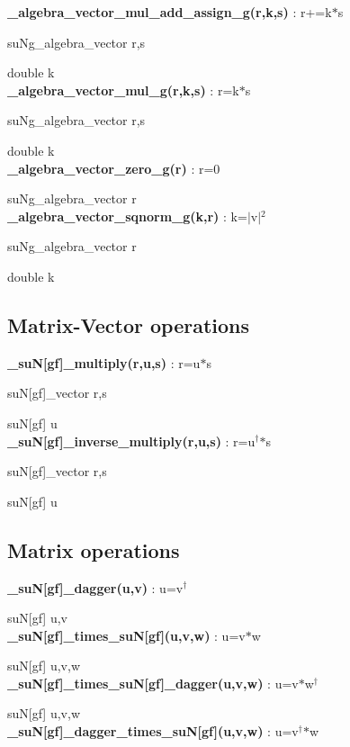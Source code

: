 \documentclass[10pt]{article}
\begin{document}
\noindent\textbf{\_algebra\_vector\_mul\_add\_assign\_g(r,k,s) } : r+=k$*$s

suNg\_algebra\_vector r,s

double k\\


\noindent\textbf{\_algebra\_vector\_mul\_g(r,k,s) } : r=k$*$s

suNg\_algebra\_vector r,s

double k\\


\noindent\textbf{\_algebra\_vector\_zero\_g(r) } : r=0

suNg\_algebra\_vector r\\


\noindent\textbf{\_algebra\_vector\_sqnorm\_g(k,r) } : k=$|$v$|$$^2$

suNg\_algebra\_vector r

double k

\subsection{Matrix-Vector operations}

\noindent\textbf{\_suN[gf]\_multiply(r,u,s) } : r=u$*$s

suN[gf]\_vector r,s

suN[gf] u\\


\noindent\textbf{\_suN[gf]\_inverse\_multiply(r,u,s) } : r=u$^\dagger$$*$s

suN[gf]\_vector r,s

suN[gf] u


\subsection{Matrix operations}

\noindent\textbf{\_suN[gf]\_dagger(u,v) } : u=v$^\dagger$

suN[gf] u,v\\


\noindent\textbf{\_suN[gf]\_times\_suN[gf](u,v,w) } : u=v$*$w

suN[gf] u,v,w\\


\noindent\textbf{\_suN[gf]\_times\_suN[gf]\_dagger(u,v,w) } : u=v$*$w$^\dagger$

suN[gf] u,v,w\\


\noindent\textbf{\_suN[gf]\_dagger\_times\_suN[gf](u,v,w) } : u=v$^\dagger$$*$w
\end{document}
